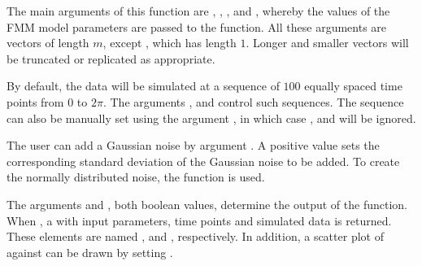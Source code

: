 The main arguments of this function are , , ,  and , whereby the values of the FMM model parameters are passed to the function. All these arguments are  vectors of length $m$, except , which has length $1$. Longer and smaller vectors will be truncated or replicated as appropriate. 

By default, the data will be simulated at a sequence of $100$ equally spaced time points from $0$ to $2\pi$. The arguments ,  and  control such sequences. The sequence can also be manually set using the argument , in which case ,  and  will be ignored.

The user can add a Gaussian noise by argument . A positive  value sets the corresponding standard deviation of the Gaussian noise to be added. To create the normally distributed noise, the  function is used.

The arguments  and , both boolean values, determine the output of the  function. When , a  with input parameters, time points and simulated data is returned. These elements are named ,  and , respectively.  In addition, a scatter plot of  against  can be drawn by setting . 

